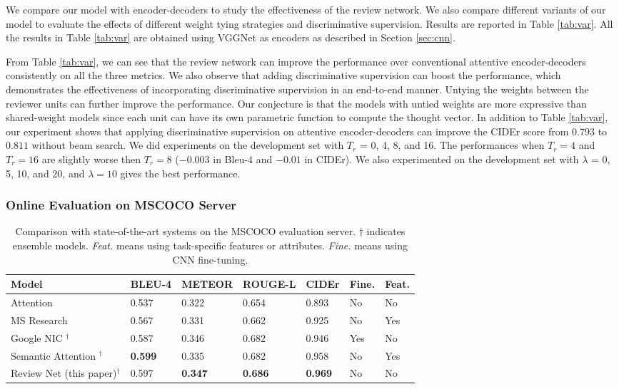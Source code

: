 \documentclass{article}
\begin{document}
We compare our model with encoder-decoders to study the effectiveness of the review network. We also compare different variants of our model to evaluate the effects of different weight tying strategies and discriminative supervision. Results are reported in Table \ref{tab:var}. All the results in Table \ref{tab:var} are obtained using VGGNet \cite{simonyan2014very} as encoders as described in Section \ref{sec:cnn}.

From Table \ref{tab:var}, we can see that the review network can improve the performance over conventional attentive encoder-decoders consistently on all the three metrics.
We also observe that adding discriminative supervision can boost the performance, which demonstrates the effectiveness of incorporating discriminative supervision in an end-to-end manner.
Untying the weights between the reviewer units can further improve the performance. Our conjecture is that the models with untied weights are more expressive than shared-weight models since each unit can have its own parametric function to compute the thought vector. In addition to Table \ref{tab:var}, our experiment shows that applying discriminative supervision on attentive encoder-decoders can improve the CIDEr score from $0.793$ to $0.811$ without beam search. We did experiments on the development set with $T_r$ = 0, 4, 8, and 16. The performances when $T_r = 4$ and $T_r = 16$ are slightly worse then $T_r = 8$ ($-0.003$ in Bleu-4 and $-0.01$ in CIDEr). We also experimented on the development set with $\lambda$ = 0, 5, 10, and 20, and $\lambda = 10$ gives the best performance.

\subsubsection{Online Evaluation on MSCOCO Server}\begin{table}[t]
  \caption{\small Comparison with state-of-the-art systems on the MSCOCO evaluation server. $\dagger$ indicates ensemble models. \textit{Feat.} means using task-specific features or attributes. \textit{Fine.} means using CNN fine-tuning.}
  \label{tab:sota}
  \centering
  \begin{tabular}{lllllll}
    \toprule
    Model & BLEU-4 & METEOR & ROUGE-L & CIDEr & Fine. & Feat. \\
    \midrule
    Attention \cite{xu2015show} & 0.537 & 0.322 & 0.654 & 0.893 & No & No \\
    MS Research \cite{fang2015captions} & 0.567  & 0.331 & 0.662 & 0.925 & No & Yes \\
    Google NIC \cite{vinyals2015show}$^{\dagger}$ & 0.587 & 0.346 & 0.682 & 0.946 & Yes & No  \\
    Semantic Attention \cite{you2016image}$^{\dagger}$ & \textbf{0.599} & 0.335  & 0.682 & 0.958 & No & Yes \\
    \midrule
    Review Net (this paper)$^{\dagger}$ & 0.597 & \textbf{0.347} & \textbf{0.686} & \textbf{0.969} & No & No \\
    \bottomrule
  \end{tabular}
\end{table}
\end{document}
